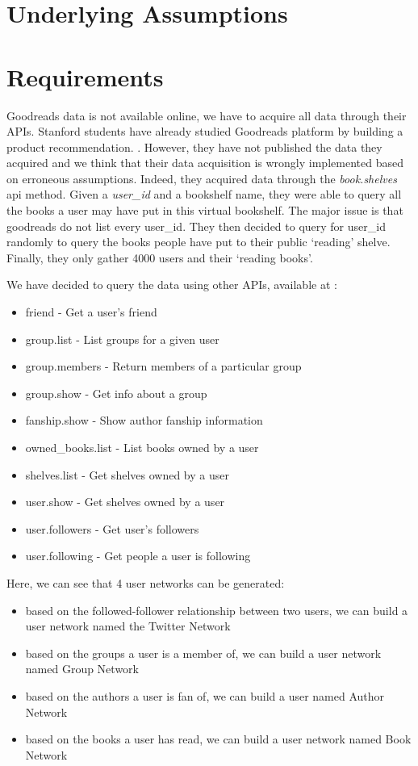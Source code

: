 \documentclass[11pt]{article}
\begin{document}
\section{Underlying Assumptions}
\section{Requirements}

Goodreads data is not available online, we have to acquire all data through their APIs. Stanford students have already studied Goodreads platform by building a product recommendation. \cite{stanford:goodreads}. However, they have not published the data they acquired and we think that their data acquisition is wrongly implemented based on erroneous assumptions. Indeed, they acquired data through the \textit{book.shelves} api method. Given a \textit{user_id} and a bookshelf name, they were able to query all the books a user may have put in this virtual bookshelf. The major issue is that goodreads do not list every user_id. They then decided to query for user_id randomly to query the books people have put to their public `reading' shelve. Finally, they only gather 4000 users and their `reading books'.

We have decided to query the data using other APIs, available at \cite{goodreads:api}:
\begin{itemize}
\item friend - Get a user's friend
\item group.list - List groups for a given user
\item group.members - Return members of a particular group
\item group.show - Get info about a group
\item fanship.show - Show author fanship information
\item owned_books.list - List books owned by a user
\item shelves.list - Get shelves owned by a user
\item user.show - Get shelves owned by a user
\item user.followers - Get user's followers
\item user.following - Get people a user is following
\end{itemize}

Here, we can see that 4 user networks can be generated:
\begin{itemize}
\item based on the followed-follower relationship between two users, we can build a user network named the Twitter Network
\item based on the groups a user is a member of, we can build a user network named Group Network
\item based on the authors a user is fan of, we can build a user named Author Network
\item based on the books a user has read, we can build a user network named Book Network
\end{itemize}
\end{document}
